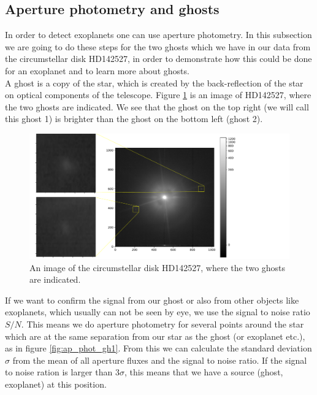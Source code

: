 \subsection{Aperture photometry and ghosts}
In order to detect exoplanets one can use aperture photometry. In this subsection we are going to do these steps for the two ghosts which we have in our data from the circumstellar disk HD142527, in order to demonstrate how this could be done for an exoplanet and to learn more about ghosts.\\
A ghost is a copy of the star, which is created by the back-reflection of the star on optical components of the telescope. Figure \ref{fig:ghosts} is an image of HD142527, where the two ghosts are indicated. We see that the ghost on the top right (we will call this ghost 1) is brighter than the ghost on the bottom left (ghost 2). 
\begin{figure}[H]
	\centering
		\includegraphics[width=1.3\textwidth]{pics/Ghosts.pdf}
		\caption{An image of the circumstellar disk HD142527, where the two ghosts are indicated.}
		\label{fig:ghosts}
\end{figure}
If we want to confirm the signal from our ghost or also from other objects like exoplanets, which usually can not be seen by eye, we use the signal to noise ratio $S/N$. This means we do aperture photometry for several points around the star which are at the same separation from our star as the ghost (or exoplanet etc.), as in figure \ref{fig:ap_phot_gh1}. From this we can calculate the standard deviation $\sigma$ from the mean of all aperture fluxes and the signal to noise ratio. If the signal to noise ration is larger than $3 \sigma$, this means that we have a source (ghost, exoplanet) at this position. 
